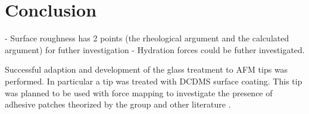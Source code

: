 \chapter{Conclusion}

- Surface roughness has 2 points (the rheological argument and the calculated argument) for futher investigation
- Hydration forces could be futher investigated.

Successful adaption and development of the glass treatment to AFM tips was performed. In particular a tip was treated with DCDMS surface coating. This tip was planned to be used with force mapping to investigate the presence of adhesive patches theorized by the group \cite{Teun1} and other literature \cite{Patchy}. 